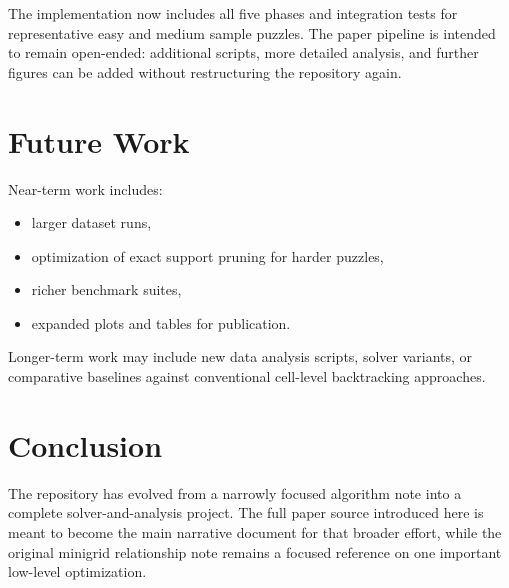 \documentclass[11pt,a4paper]{article}
\begin{document}
The implementation now includes all five phases and integration tests for representative easy and medium sample puzzles. The paper pipeline is intended to remain open-ended: additional scripts, more detailed analysis, and further figures can be added without restructuring the repository again.

\section{Future Work}

Near-term work includes:
\begin{itemize}
    \item larger dataset runs,
    \item optimization of exact support pruning for harder puzzles,
    \item richer benchmark suites,
    \item expanded plots and tables for publication.
\end{itemize}

Longer-term work may include new data analysis scripts, solver variants, or comparative baselines against conventional cell-level backtracking approaches.

\section{Conclusion}

The repository has evolved from a narrowly focused algorithm note into a complete solver-and-analysis project. The full paper source introduced here is meant to become the main narrative document for that broader effort, while the original minigrid relationship note remains a focused reference on one important low-level optimization.
\end{document}
